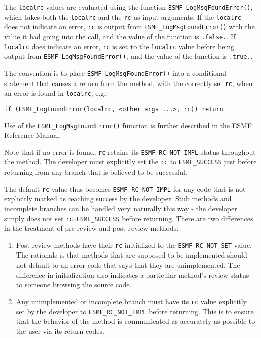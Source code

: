 The {\tt localrc} values are evaluated using the function {\tt ESMF\_LogMsgFoundError()}, which takes both the {\tt localrc} and the {\tt rc} as input arguments. If the {\tt localrc} does not indicate an error, {\tt rc} is output from {\tt ESMF\_LogMsgFoundError()} with the value it had going into the call, and the value of the function is {\tt .false.}. If {\tt localrc} does indicate an error, {\tt rc} is set to the {\tt localrc} value before being output from {\tt ESMF\_LogMsgFoundError()}, and the value of the function is {\tt .true.}.

The convention is to place {\tt ESMF\_LogMsgFoundError()} into a conditional statement that causes a return from the method, with the correctly set {\tt rc}, when an error is found in {\tt localrc}, e.g.:
\begin{verbatim}
if (ESMF_LogFoundError(localrc, <other args ...>, rc)) return
\end{verbatim}
Use of the {\tt ESMF\_LogMsgFoundError()} function is further described in the ESMF Reference Manual.

Note that if no error is found, {\tt rc} retains its {\tt ESMF\_RC\_NOT\_IMPL} status throughout the method. The developer must explicitly set the {\tt rc} to {\tt ESMF\_SUCCESS} just before returning from any branch that is believed to be successful.

The default {\tt rc} value thus becomes {\tt ESMF\_RC\_NOT\_IMPL} for any code that is not explicitly marked as reaching success by the developer. Stub methods and incomplete branches can be handled very naturally this way - the developer simply does not set {\tt rc=ESMF\_SUCCESS} before returning. There are two differences in the treatment of pre-review and post-review methods:
\begin{enumerate}
\item Post-review methods have their {\tt rc} initialized to the {\tt ESMF\_RC\_NOT\_SET} value. The rationale is that methods that are supposed to be implemented should not default to an error code that says that they are unimplemented. The difference in initialization also indicates a particular method's review status to someone browsing the source code.

\item Any unimplemented or incomplete branch must have its {\tt rc} value explicitly set by the developer to {\tt ESMF\_RC\_NOT\_IMPL} before returning. This is to ensure that the behavior of the method is communicated as accurately as possible to the user via its return codes.

\end{enumerate}

